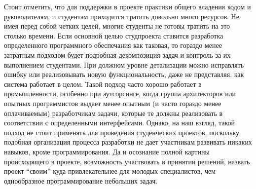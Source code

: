 \documentclass[a4paper]{article}
\begin{document}
Стоит отметить, что для поддержки в проекте практики общего владения кодом и руководителям, и студентам приходится тратить довольно много ресурсов. Не имея перед собой четких целей, многие студенты не готовы тратить на это столько времени. Если основной целью студпроекта ставится разработка определенного программного обеспечания как таковая, то гораздо менее затратным подходом будет подробная декомпозиция задач и контроль за их выполнением студентами.  При должном уровне детализации можно исправлять ошибку или реализовывать новую функциональность, даже не представляя, как система работает в целом. 
Такой подход часто хорошо работает в промышленности, особенно при аутсорсинге, когда группа архитекторов или опытных программистов выдает менее опытным (и часто гораздо менее оплачиваемым) разработчикам задачи, которые те должны реализовать в соответствии с определенными интерфейсами. Однако, на наш взгляд, такой подход не стоит применять для проведения студенческих проектов, поскольку подобная организация процесса разработки не дает участникам развивать никаких навыков, кроме программирования. Да и осознание полной картины происходящего в проекте, возможность участвовать в принятии решений, назвать проект ``своим'' куда привлекательнее для молодых специалистов, чем однообразное программирование небольших задач. 
\end{document}

